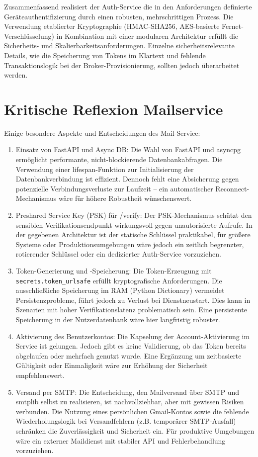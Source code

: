 Zusammenfassend realisiert der Auth-Service die in den Anforderungen definierte Geräteauthentifizierung durch einen robusten, mehrschrittigen Prozess. Die Verwendung etablierter Kryptographie (HMAC-SHA256, AES-basierte Fernet-Verschlüsselung) in Kombination mit einer modularen Architektur erfüllt die Sicherheits- und Skalierbarkeitsanforderungen. Einzelne sicherheitsrelevante Details, wie die Speicherung von Tokens im Klartext und fehlende Transaktionslogik bei der Broker-Provisionierung, sollten jedoch überarbeitet werden.
\section{Kritische Reflexion Mailservice}
Einige besondere Aspekte und Entscheidungen des Mail-Service:
\begin{enumerate}
    \item Einsatz von FastAPI und Async DB: Die Wahl von FastAPI und asyncpg ermöglicht performante, nicht-blockierende Datenbankabfragen. Die Verwendung einer lifespan-Funktion zur Initialisierung der Datenbankverbindung ist effizient. Dennoch fehlt eine Absicherung gegen potenzielle Verbindungsverluste zur Laufzeit – ein automatischer Reconnect-Mechanismus wäre für höhere Robustheit wünschenswert.
    \item Preshared Service Key (PSK) für /verify: Der PSK-Mechanismus schützt den sensiblen Verifikationsendpunkt wirkungsvoll gegen unautorisierte Aufrufe. In der gegebenen Architektur ist der statische Schlüssel praktikabel, für größere Systeme oder Produktionsumgebungen wäre jedoch ein zeitlich begrenzter, rotierender Schlüssel oder ein dedizierter Auth-Service vorzuziehen.
    \item Token-Generierung und -Speicherung: Die Token-Erzeugung mit \\ \texttt{secrets.token\_urlsafe} erfüllt kryptografische Anforderungen. Die ausschließliche Speicherung im RAM (Python Dictionary) vermeidet Persistenzprobleme, führt jedoch zu Verlust bei Dienstneustart. Dies kann in Szenarien mit hoher Verifikationslatenz problematisch sein. Eine persistente Speicherung in der Nutzerdatenbank wäre hier langfristig robuster.
    \item Aktivierung des Benutzerkontos: Die Kapselung der Account-Aktivierung im Service ist gelungen. Jedoch gibt es keine Validierung, ob das Token bereits abgelaufen oder mehrfach genutzt wurde. Eine Ergänzung um zeitbasierte Gültigkeit oder Einmaligkeit wäre zur Erhöhung der Sicherheit empfehlenswert.
    \item Versand per SMTP: Die Entscheidung, den Mailversand über SMTP und smtplib selbst zu realisieren, ist nachvollziehbar, aber mit gewissen Risiken verbunden. Die Nutzung eines persönlichen Gmail-Kontos sowie die fehlende Wiederholungslogik bei Versandfehlern (z.B. temporärer SMTP-Ausfall) schränken die Zuverlässigkeit und Sicherheit ein. Für produktive Umgebungen wäre ein externer Maildienst mit stabiler API und Fehlerbehandlung vorzuziehen.

\end{enumerate}
